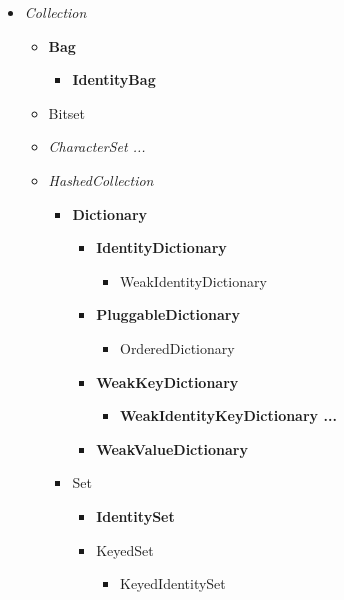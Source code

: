 \documentclass[a4paper,10pt,twoside]{book}
\begin{document}
\begin{figure}
\begin{center}
\small
{}
\begin{itemize}
\item{\emph{Collection}}
    \begin{itemize}
    \item{\textbf{Bag}}
        \begin{itemize}
        \item{\textbf{IdentityBag}}
        \end{itemize}
    \item{Bitset}
    \item{\emph{CharacterSet ...}}
    \item{\emph{HashedCollection}}
        \begin{itemize}
        \item{\textbf{Dictionary}}
            \begin{itemize}
            \item{\textbf{IdentityDictionary}}
                \begin{itemize}
                \item{WeakIdentityDictionary}
                \end{itemize}
            \item{\textbf{PluggableDictionary}}
                \begin{itemize}
                \item{OrderedDictionary}
                \end{itemize}
            \item{\textbf{WeakKeyDictionary}}
                \begin{itemize}
                \item{\textbf{WeakIdentityKeyDictionary ...}}
                \end{itemize}
            \item{\textbf{WeakValueDictionary}}
            \end{itemize}
        \item{Set}
            \begin{itemize}
            \item{\textbf{IdentitySet}}
            \item{KeyedSet}
                \begin{itemize}
                \item{KeyedIdentitySet}

\end{itemize}
\end{itemize}
\end{itemize}
\end{itemize}
\end{itemize}
\end{center}
\end{figure}
\end{document}
